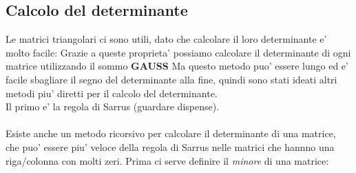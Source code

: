 \documentclass{report}
\begin{document}
\subsection{Calcolo del determinante}
Le matrici triangolari ci sono utili, dato che calcolare il loro determinante e' molto facile:
Grazie a queste proprieta' possiamo calcolare il determinante di ogni matrice utilizzando il sommo \textbf{GAUSS}
Ma questo metodo puo' essere lungo ed e' facile sbagliare il segno del determinante alla fine, quindi sono stati ideati altri metodi piu' diretti per il calcolo del determinante.\\
Il primo e' la regola di Sarrus (guardare dispense).\\
\\
Esiste anche un metodo ricorsivo per calcolare il determinante di una matrice, che puo' essere piu' veloce della regola di Sarrus nelle matrici che hannno una riga/colonna con molti zeri. Prima ci serve definire il \textit{minore} di una matrice:
\end{document}
